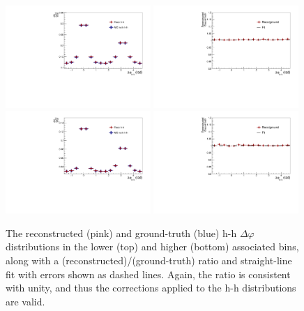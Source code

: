\begin{figure}[ht]
    \centering
    \includegraphics[width=0.49\textwidth]{figures/analysis/h_h_dphi_closure_lowpt.pdf}
    \includegraphics[width=0.49\textwidth]{figures/analysis/h_h_dphi_closure_ratio_lowpt.pdf}
    \includegraphics[width=0.49\textwidth]{figures/analysis/h_h_dphi_closure_highpt.pdf}
    \includegraphics[width=0.49\textwidth]{figures/analysis/h_h_dphi_closure_ratio_highpt.pdf}
    \caption{The reconstructed (pink) and ground-truth (blue) h-h $\Delta\varphi$ distributions in the lower (top) and higher (bottom) associated \pt bins, along with a (reconstructed)/(ground-truth) ratio and straight-line fit with errors shown as dashed lines. Again, the ratio is consistent with unity, and thus the corrections applied to the h-h distributions are valid.}
    \label{fig:h_h_closure}
\end{figure}

